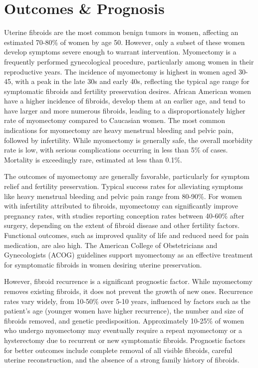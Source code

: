 \section*{Outcomes \& Prognosis}
Uterine fibroids are the most common benign tumors in women, affecting an estimated 70-80\% of women by age 50. However, only a subset of these women develop symptoms severe enough to warrant intervention. Myomectomy is a frequently performed gynecological procedure, particularly among women in their reproductive years. The incidence of myomectomy is highest in women aged 30-45, with a peak in the late 30s and early 40s, reflecting the typical age range for symptomatic fibroids and fertility preservation desires. African American women have a higher incidence of fibroids, develop them at an earlier age, and tend to have larger and more numerous fibroids, leading to a disproportionately higher rate of myomectomy compared to Caucasian women. The most common indications for myomectomy are heavy menstrual bleeding and pelvic pain, followed by infertility. While myomectomy is generally safe, the overall morbidity rate is low, with serious complications occurring in less than 5\% of cases. Mortality is exceedingly rare, estimated at less than 0.1\%.

The outcomes of myomectomy are generally favorable, particularly for symptom relief and fertility preservation. Typical success rates for alleviating symptoms like heavy menstrual bleeding and pelvic pain range from 80-90\%. For women with infertility attributed to fibroids, myomectomy can significantly improve pregnancy rates, with studies reporting conception rates between 40-60\% after surgery, depending on the extent of fibroid disease and other fertility factors. Functional outcomes, such as improved quality of life and reduced need for pain medication, are also high. The American College of Obstetricians and Gynecologists (ACOG) guidelines support myomectomy as an effective treatment for symptomatic fibroids in women desiring uterine preservation.

However, fibroid recurrence is a significant prognostic factor. While myomectomy removes existing fibroids, it does not prevent the growth of new ones. Recurrence rates vary widely, from 10-50\% over 5-10 years, influenced by factors such as the patient's age (younger women have higher recurrence), the number and size of fibroids removed, and genetic predisposition. Approximately 10-25\% of women who undergo myomectomy may eventually require a repeat myomectomy or a hysterectomy due to recurrent or new symptomatic fibroids. Prognostic factors for better outcomes include complete removal of all visible fibroids, careful uterine reconstruction, and the absence of a strong family history of fibroids.

